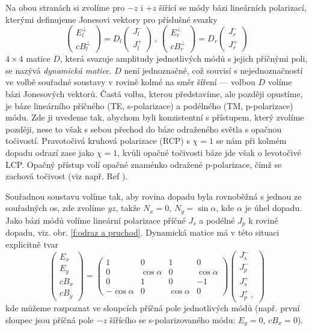 Na obou stranách si zvolíme pro $-z$ i $+z$ šířící se módy bázi lineárních polarizací, kterými definujeme Jonesovi vektory pro příslušné svazky
\begin{equation}
\begin{pmatrix} E^\perp_l \\ cB^\perp_l \end{pmatrix}=D_l \begin{pmatrix} J^-_l \\ J^+_l \end{pmatrix} \,, \,
\begin{pmatrix} E^\perp_r \\ cB^\perp_r \end{pmatrix}=D_r \begin{pmatrix} J^-_r \\ J^+_r \end{pmatrix}
\end{equation}
$4\times 4$ matice $D$, která svazuje amplitudy jednotlivých módů s jejich příčnými poli, se nazývá \emph{dynamická matice}.
$D$ není jednoznačné, což souvisí s nejednoznačností ve volbě souřadné soustavy v rovině kolmé na směr šíření --- volbou $D$ volíme bázi Jonesových vektorů.
Častá volba, kterou představíme, ale později opustíme, je báze lineárního příčného (TE, s-polarizace) a podélného (TM, p-polarizace) módu.
Zde ji uvedeme tak, abychom byli konzistentní s přístupem, který zvolíme později, nese to však s sebou přechod do báze odraženého světla s opačnou točivostí.
Pravotočivá kruhová polarizace (RCP) s $\chi=1$ se nám při kolmém dopadu odrazí zase jako $\chi=1$, kvůli opačné točivosti báze jde však o levotočivé LCP.
Opačný přístup volí opačné znaménko odražené p-polarizace, čímž se zachová točivost (viz např. Ref \cite{Silber}).

Souřadnou soustavu volíme tak, aby rovina dopadu byla rovnoběžná s jednou ze souřadných os, zde zvolíme $yz$, takže $N_x=0$, $N_y=\sin \alpha$, kde $\alpha$ je úhel dopadu.
Jako bázi módů volíme lineární polarizace příčné $J_s$ a podélné $J_p$ k rovině dopadu, viz. obr. \ref{f:odraz a pruchod}.
Dynamická matice má v této situaci explicitně tvar
\begin{equation}
\begin{pmatrix} E_x \\ E_y \\ cB_x \\ cB_y \end{pmatrix}
=\begin{pmatrix}
1 & 0 & 1 & 0 \\
0 & \cos\alpha & 0 & \cos\alpha \\
0 & 1 & 0 & -1 \\
-\cos\alpha & 0 & \cos\alpha & 0
\end{pmatrix}
\begin{pmatrix}
J^-_{s} \\ J^-_{p} \\ J^+_s \\ J^+_{p} \,,
\end{pmatrix}
\end{equation}
kde můžeme rozpoznat ve sloupcích příčná pole jednotlivých módů (např. první sloupec jsou příčná pole $-z$ šířícího se s-polarizovaného módu: $E_y=0$, $cB_x=0$).

